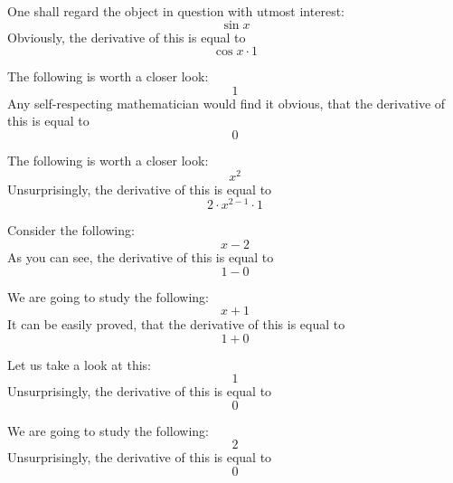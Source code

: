 \documentclass{article}
\begin{document}
One shall regard the object in question with utmost interest:
\begin{equation}
\sin x 
\end{equation}
Obviously, the derivative of this is equal to
\begin{equation}
\cos x \cdot 1 
\end{equation}

The following is worth a closer look:
\begin{equation}
1 
\end{equation}
Any self-respecting mathematician would find it obvious, that the derivative of this is equal to
\begin{equation}
0 
\end{equation}

The following is worth a closer look:
\begin{equation}
x ^{2 } 
\end{equation}
Unsurprisingly, the derivative of this is equal to
\begin{equation}
2 \cdot x ^{2 - 1 } \cdot 1 
\end{equation}

Consider the following:
\begin{equation}
x - 2 
\end{equation}
As you can see, the derivative of this is equal to
\begin{equation}
1 - 0 
\end{equation}

We are going to study the following:
\begin{equation}
x + 1 
\end{equation}
It can be easily proved, that the derivative of this is equal to
\begin{equation}
1 + 0 
\end{equation}

Let us take a look at this:
\begin{equation}
1 
\end{equation}
Unsurprisingly, the derivative of this is equal to
\begin{equation}
0 
\end{equation}

We are going to study the following:
\begin{equation}
2 
\end{equation}
Unsurprisingly, the derivative of this is equal to
\begin{equation}
0 
\end{equation}
\end{document}

